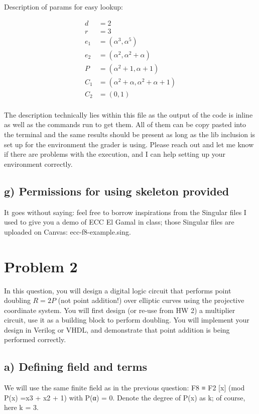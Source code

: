 \documentclass[a4paper,11pt]{exam}
\begin{document}
\newline
\noindent
Description of params for easy lookup:

\begin{align*}
  d &= 2\\
  r &= 3\\
e_1 &= (\alpha^3,\alpha^5)\\
e_2 &= (\alpha^2,\alpha^2 + \alpha)\\
  P &= (\alpha^2 + 1,\alpha + 1)\\
C_1 &= (\alpha^2 + \alpha,\alpha^2 + \alpha + 1)\\
C_2 &= (0,1)\\
\end{align*}

\noindent
The description technically lies within this file as the output of the code is inline as well as the commands run to get them. All of them can be copy pasted into the terminal and the same results should be present as long as the lib inclusion is set up for the environment the grader is using. Please reach out and let me know if there are problems with the execution, and I can help setting up your environment correctly. 

\subsection{g) Permissions for using skeleton provided}
\label{sec:orge8e1156}
It goes without saying: feel free to borrow inspirations from the Singular files I used to give you a demo of ECC El Gamal in class; those Singular files are uploaded on Canvas: ecc-f8-example.sing.



\section{Problem 2}
\label{sec:orgfa62b9a}
In this question, you will design a digital logic circuit that performs point doubling \(R = 2P\)  (not point addition!) over elliptic curves using the projective coordinate system. You will first design (or re-use from HW 2) a multiplier circuit, use it as a building block to perform doubling. You will implement your design in Verilog or VHDL, and demonstrate that point addition is being performed correctly.

\subsection{a) Defining field and terms}
\label{sec:org9013fed}
We will use the same finite field as in the previous question: F8 ≡ F2 [x] (mod P(x) =x3 + x2 + 1) with P(α) = 0. Denote the degree of P(x) as k; of course, here k = 3.
\end{document}
